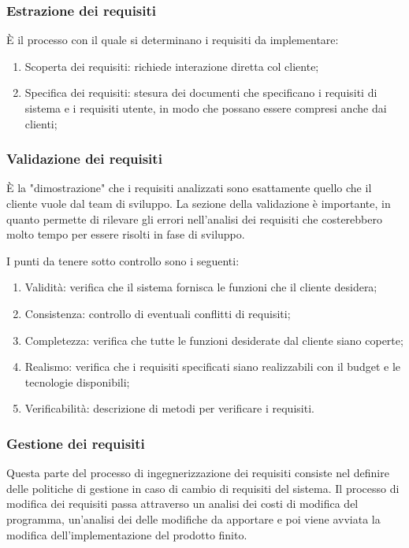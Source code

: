 \documentclass[a4paper, 10pt]{article}
\begin{document}
	\subsubsection{Estrazione dei requisiti}
	È il processo con il quale si determinano i requisiti da implementare:
	\begin{enumerate}
		\item Scoperta dei requisiti: richiede interazione diretta col cliente;
		\item Specifica dei requisiti: stesura dei documenti che specificano i requisiti di sistema e i requisiti utente, in modo che possano essere compresi anche dai clienti;
	\end{enumerate}

	\subsubsection{Validazione dei requisiti}
	È la "dimostrazione" che i requisiti analizzati sono esattamente quello che il cliente vuole dal team di sviluppo. La sezione della validazione è importante, in quanto permette di rilevare gli errori nell'analisi dei requisiti che costerebbero molto tempo per essere risolti in fase di sviluppo.
	
	I punti da tenere sotto controllo sono i seguenti:
	\begin{enumerate}
		\item Validità: verifica che il sistema fornisca le funzioni che il cliente desidera;
		\item Consistenza: controllo di eventuali conflitti di requisiti;
		\item Completezza: verifica che tutte le funzioni desiderate dal cliente siano coperte;
		\item Realismo: verifica che i requisiti specificati siano realizzabili con il budget e le tecnologie disponibili;
		\item Verificabilità: descrizione di metodi per verificare i requisiti.
	\end{enumerate}

	\subsubsection{Gestione dei requisiti}
	Questa parte del processo di ingegnerizzazione dei requisiti consiste nel definire delle politiche di gestione in caso di cambio di requisiti del sistema.
	Il processo di modifica dei requisiti passa attraverso un analisi dei costi di modifica del programma, un'analisi dei delle modifiche da apportare e poi viene avviata la modifica dell'implementazione del prodotto finito.
	
\end{document}
